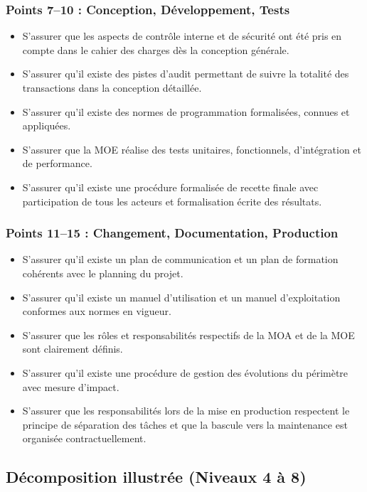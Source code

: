\subsubsection{Points 7--10 : Conception, Développement, Tests}
\begin{itemize}
    \item S'assurer que les aspects de contrôle interne et de sécurité ont été pris en compte dans le cahier des charges dès la conception générale.
    \item S'assurer qu'il existe des pistes d'audit permettant de suivre la totalité des transactions dans la conception détaillée.
    \item S'assurer qu'il existe des normes de programmation formalisées, connues et appliquées.
    \item S'assurer que la MOE réalise des tests unitaires, fonctionnels, d'intégration et de performance.
    \item S'assurer qu'il existe une procédure formalisée de recette finale avec participation de tous les acteurs et formalisation écrite des résultats.
\end{itemize}

\subsubsection{Points 11--15 : Changement, Documentation, Production}
\begin{itemize}
    \item S'assurer qu'il existe un plan de communication et un plan de formation cohérents avec le planning du projet.
    \item S'assurer qu'il existe un manuel d'utilisation et un manuel d'exploitation conformes aux normes en vigueur.
    \item S'assurer que les rôles et responsabilités respectifs de la MOA et de la MOE sont clairement définis.
    \item S'assurer qu'il existe une procédure de gestion des évolutions du périmètre avec mesure d'impact.
    \item S'assurer que les responsabilités lors de la mise en production respectent le principe de séparation des tâches et que la bascule vers la maintenance est organisée contractuellement.
\end{itemize}

\subsection{Décomposition illustrée (Niveaux 4 à 8)}

